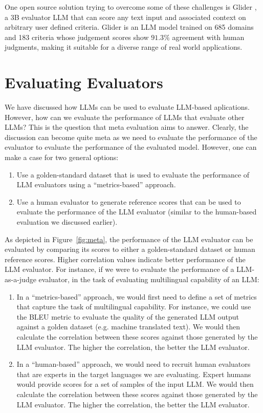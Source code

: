 One open source solution trying to overcome some of these challenges is Glider , a 3B evaluator LLM that can score any text input and associated context on arbitrary user defined criteria. Glider is an LLM model trained on 685 domains and 183 criteria whose judgement scores show $91.3\%$ agreement with human judgments, making it suitable for a diverse range of real world applications.

\section{Evaluating Evaluators}

We have discussed how LLMs can be used to evaluate LLM-based aplications. However, how can we evaluate the performance of LLMs that evaluate other LLMs? This is the question that meta evaluation aims to answer. Clearly, the discussion can become quite meta as we need to evaluate the performance of the evaluator to evaluate the performance of the evaluated model. However, one can make a case for two general options:

\begin{enumerate}
    \item Use a golden-standard dataset that is used to evaluate the performance of LLM evaluators using a ``metrics-based'' approach.
    \item Use a human evaluator to generate reference scores that can be used to evaluate the performance of the LLM evaluator (similar to the human-based evaluation we discussed earlier).
\end{enumerate}
As depicted in Figure~\ref{fig:meta}, the performance of the LLM evaluator can be evaluated by comparing its scores to either a golden-standard dataset or human reference scores. Higher correlation values indicate better performance of the LLM evaluator. For instance, if we were to evaluate the performance of a LLM-as-a-judge evaluator, in the task of evaluating multilingual capability of an LLM:
\begin{enumerate}
    \item In a ``metrics-based'' approach, we would first need to define a set of metrics that capture the task of multilingual capability. For instance, we could use the BLEU metric to evaluate the quality of the generated LLM output against a golden dataset (e.g. machine translated text). We would then calculate the correlation between these scores against those generated by the LLM evaluator. The higher the correlation, the better the LLM evaluator.
    \item In a ``human-based'' approach, we would need to recruit human evaluators that are experts in the target languages we are evaluating. Expert humans would provide scores for a set of samples of the input LLM. We would then calculate the correlation between these scores against those generated by the LLM evaluator. The higher the correlation, the better the LLM evaluator.
\end{enumerate}

